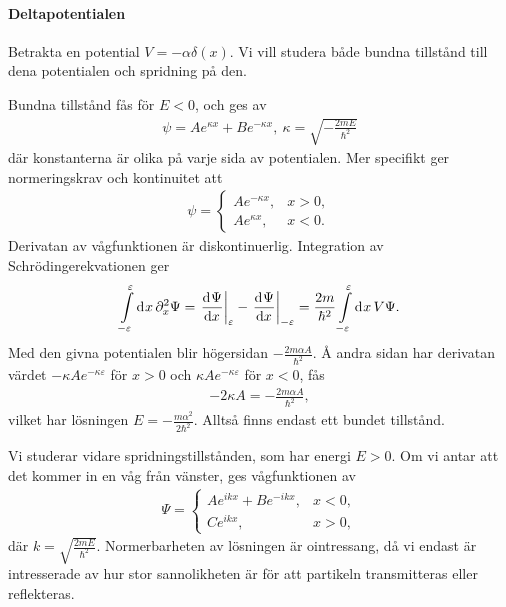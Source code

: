 \paragraph{Deltapotentialen}
Betrakta en potential $V = -\alpha\delta(x)$. Vi vill studera både bundna tillstånd till dena potentialen och spridning på den.

Bundna tillstånd fås för $E < 0$, och ges av
\begin{align*}
	\psi = Ae^{\kappa x} + Be^{-\kappa x},\ \kappa = \sqrt{-\frac{2mE}{\hbar^{2}}}
\end{align*}
där konstanterna är olika på varje sida av potentialen. Mer specifikt ger normeringskrav och kontinuitet att
\begin{align*}
	\psi =
	\begin{cases}
		Ae^{-\kappa x}, &x > 0, \\
		Ae^{\kappa x},  &x < 0.
	\end{cases}
\end{align*}
Derivatan av vågfunktionen är diskontinuerlig. Integration av Schrödingerekvationen ger
\begin{align*}
	\integ{-\varepsilon}{\varepsilon}{x}{\del[2]{x}{\Psi}} = \deval{\Psi}{x}{\varepsilon} - \deval{\Psi}{x}{-\varepsilon} = \frac{2m}{\hbar^{2}}\integ{-\varepsilon}{\varepsilon}{x}{V\Psi}.
\end{align*}
Med den givna potentialen blir högersidan $-\frac{2m\alpha A}{\hbar^{2}}$. Å andra sidan har derivatan värdet $-\kappa Ae^{-\kappa\varepsilon}$ för $x > 0$ och $\kappa Ae^{-\kappa\varepsilon}$ för $x < 0$, fås
\begin{align*}
	-2\kappa A = -\frac{2m\alpha A}{\hbar^{2}},
\end{align*}
vilket har lösningen $E = -\frac{m\alpha^{2}}{2\hbar^{2}}$. Alltså finns endast ett bundet tillstånd.

Vi studerar vidare spridningstillstånden, som har energi $E > 0$. Om vi antar att det kommer in en våg från vänster, ges vågfunktionen av
\begin{align*}
	\Psi =
	\begin{cases}
		 Ae^{ikx} + Be^{-ikx}, &x < 0, \\
		 Ce^{ikx},             &x > 0,
	\end{cases}
\end{align*}
där $k = \sqrt{\frac{2mE}{\hbar^{2}}}$. Normerbarheten av lösningen är ointressang, då vi endast är intresserade av hur stor sannolikheten är för att partikeln transmitteras eller reflekteras.

